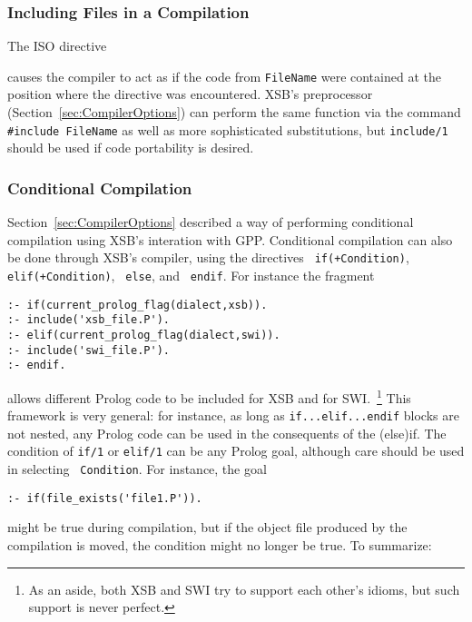 \subsubsection{Including Files in a Compilation}

\begin{description}


The ISO directive 


\noindent
causes the compiler to act as if the code from {\tt FileName} were
contained at the position where the directive was encountered.  XSB's
preprocessor (Section~\ref{sec:CompilerOptions}) can perform the same
function via the command \verb|#include FileName| as well as more
sophisticated substitutions, but {\tt include/1} should be used if
code portability is desired.

\end{description}

\subsubsection{Conditional Compilation}
%
Section~\ref{sec:CompilerOptions} described a way of performing
conditional compilation using XSB's interation with GPP.  Conditional
compilation can also be done through XSB's compiler, using the
directives {\tt \mif{} if(+Condition)}, {\tt \mif{} elif(+Condition)},
{\tt \mif{} else}, and {\tt \mif{} endif}.  For instance the fragment

\begin{verbatim}
:- if(current_prolog_flag(dialect,xsb)).
:- include('xsb_file.P').
:- elif(current_prolog_flag(dialect,swi)).
:- include('swi_file.P').
:- endif.
\end{verbatim}
\noindent
allows different Prolog code to be included for XSB and for
SWI.~\footnote{As an aside, both XSB and SWI try to support each
  other's idioms, but such support is never perfect.}  This framework
is very general: for instance, as long as {\tt if...elif...endif}
blocks are not nested, any Prolog code can be used in the consequents
of the (else)if.  The condition of {\tt if/1} or {\tt elif/1} can be
any Prolog goal, although care should be used in selecting {\tt
  Condition}.  For instance, the goal

\begin{verbatim}
:- if(file_exists('file1.P')).
\end{verbatim}
\noindent
might be true during compilation, but if the object file produced by
the compilation is moved, the condition might no longer be true.  To
summarize:

